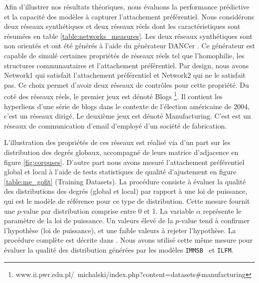 \documentclass[french]{hermes-journal}
\newcommand{\ilfm}{\texttt{ILFM}}
\newcommand{\immsb}{\texttt{IMMSB}}
\begin{document}
Afin d'illustrer nos résultats théoriques, nous évaluons la performance prédictive et la capacité des modèles à capturer l'attachement préférentiel. Nous considérons deux réseaux synthétiques et deux réseaux réels dont les caractéristiques sont résumées en table \ref{table:networks_measures}. Les deux réseaux synthétiques sont non orientés et ont été générés à l'aide du générateur DANCer \cite{largeron2015}. Ce générateur est capable de  simulé certaines propriétés de réseaux réels tel que l'homophilie, les structures communautaires et l'attachement préférentiel. Par design, nous avons Network1 qui satisfait l'attachement préférentiel et Network2 qui ne le satisfait pas. Ce choix permet d'avoir deux réseaux de contrôles pour cette propriété. Du coté des réseaux réels, le premier jeux est dénoté Blogs \footnote{www.ii.pwr.edu.pl/~michalski/index.php?content=datasets\#manufacturing}. Il contient les hyperliens d'une série de blogs dans le contexte de l'élection américaine de 2004, c'est un réseaux dirigé. Le deuxième jeux est dénoté Manufacturing. C'est est un réseaux de communication d'email d'employé d'un société de fabrication. 



L'illustration des propriétés de ces réseaux est réalisé via d'un part sur les distribution des degrés globaux, accompagné de leurs matrice d'adjacence en figure \ref{fig:corpuses}. D'autre part nous avons mesuré l'attachement préférentiel global et local à l'aide de tests statistiques de qualité d'ajustement en figure \ref{table:me_gofit} (Training Datasets). La procédure consiste à évaluer la qualité des distributions des degrés (global et local) par rapport à une loi de puissance, qui est le modèle de référence pour ce type de distribution. Cette mesure fournit une $p$-value par distribution comprise entre 0 et 1. La variable $\alpha$ représente le paramètre de la loi de puissance. Un valeurs élevé de la $p$-value tend à confirmer l'hypothèse (loi de puissance), et une faible valeurs à rejeter l'hypothèse. La procédure complète est décrite dans \cite{clauset2009power}.
Nous avons utilisé cette même mesure pour évaluer la qualité des distribution générées par les modèles \immsb~ et \ilfm.
\end{document}

